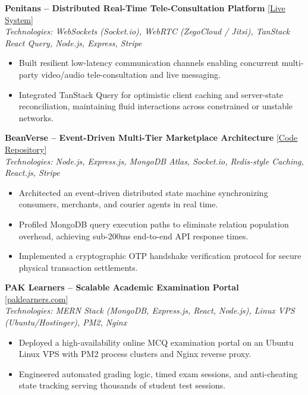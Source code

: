 \documentclass[10pt,a4paper]{article}
\begin{document}
\vspace{3pt}
\textbf{Penitans -- Distributed Real-Time Tele-Consultation Platform} \hfill \href{https://penitans.com}{[Live System]} \\
\textit{Technologies: WebSockets (Socket.io), WebRTC (ZegoCloud / Jitsi), TanStack React Query, Node.js, Express, Stripe}
\begin{itemize}
    \item Built resilient low-latency communication channels enabling concurrent multi-party video/audio tele-consultation and live messaging.
    \item Integrated TanStack Query for optimistic client caching and server-state reconciliation, maintaining fluid interactions across constrained or unstable networks.
\end{itemize}

\vspace{3pt}
\textbf{BeanVerse -- Event-Driven Multi-Tier Marketplace Architecture} \hfill \href{https://github.com/nabilroghani/bean-verse}{[Code Repository]} \\
\textit{Technologies: Node.js, Express.js, MongoDB Atlas, Socket.io, Redis-style Caching, React.js, Stripe}
\begin{itemize}
    \item Architected an event-driven distributed state machine synchronizing consumers, merchants, and courier agents in real time.
    \item Profiled MongoDB query execution paths to eliminate relation population overhead, achieving sub-200ms end-to-end API response times.
    \item Implemented a cryptographic OTP handshake verification protocol for secure physical transaction settlements.
\end{itemize}

\vspace{3pt}
\textbf{PAK Learners -- Scalable Academic Examination Portal} \hfill \href{https://paklearners.com}{[paklearners.com]} \\
\textit{Technologies: MERN Stack (MongoDB, Express.js, React, Node.js), Linux VPS (Ubuntu/Hostinger), PM2, Nginx}
\begin{itemize}
    \item Deployed a high-availability online MCQ examination portal on an Ubuntu Linux VPS with PM2 process clusters and Nginx reverse proxy.
    \item Engineered automated grading logic, timed exam sessions, and anti-cheating state tracking serving thousands of student test sessions.
\end{itemize}
\end{document}
